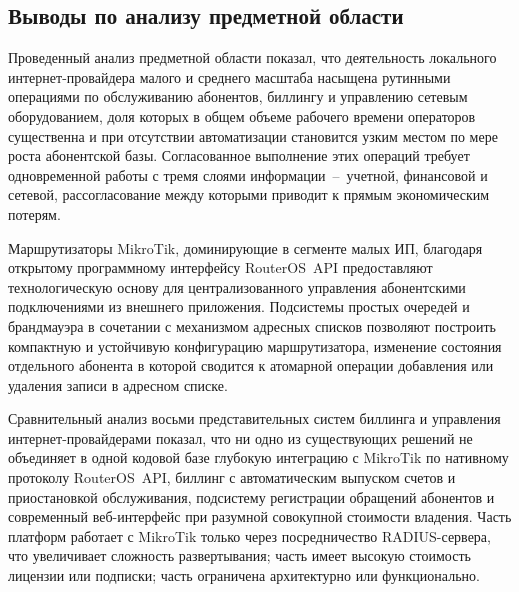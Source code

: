 \subsection{Выводы по анализу предметной области}

Проведенный анализ предметной области показал, что деятельность локального интернет-провайдера малого и среднего масштаба насыщена рутинными операциями по обслуживанию абонентов, биллингу и управлению сетевым оборудованием, доля которых в общем объеме рабочего времени операторов существенна и при отсутствии автоматизации становится узким местом по мере роста абонентской базы. Согласованное выполнение этих операций требует одновременной работы с тремя слоями информации~--~учетной, финансовой и сетевой, рассогласование между которыми приводит к прямым экономическим потерям.

Маршрутизаторы MikroTik, доминирующие в сегменте малых ИП, благодаря открытому программному интерфейсу RouterOS~API предоставляют технологическую основу для централизованного управления абонентскими подключениями из внешнего приложения. Подсистемы простых очередей и брандмауэра в сочетании с механизмом адресных списков позволяют построить компактную и устойчивую конфигурацию маршрутизатора, изменение состояния отдельного абонента в которой сводится к атомарной операции добавления или удаления записи в адресном списке.

Сравнительный анализ восьми представительных систем биллинга и управления интернет-провайдерами показал, что ни одно из существующих решений не объединяет в одной кодовой базе глубокую интеграцию с MikroTik по нативному протоколу RouterOS~API, биллинг с автоматическим выпуском счетов и приостановкой обслуживания, подсистему регистрации обращений абонентов и современный веб-интерфейс при разумной совокупной стоимости владения. Часть платформ работает с MikroTik только через посредничество RADIUS-сервера, что увеличивает сложность развертывания; часть имеет высокую стоимость лицензии или подписки; часть ограничена архитектурно или функционально.

